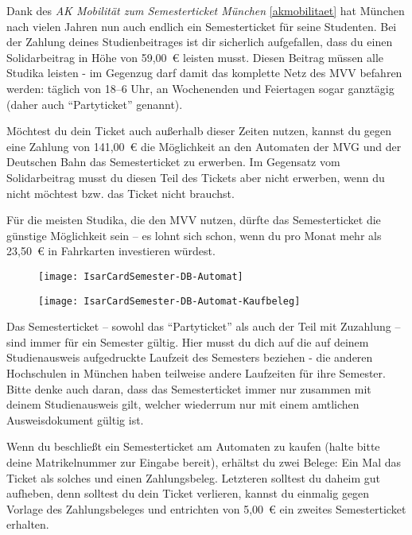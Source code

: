 Dank des \emph{AK Mobilität zum Semesterticket München} \ref{akmobilitaet} hat München nach vielen Jahren nun auch endlich ein Semesterticket für seine Studenten. Bei der Zahlung deines Studienbeitrages ist dir sicherlich aufgefallen, dass du einen Solidarbeitrag in Höhe von 59,00~€ leisten musst. Diesen Beitrag müssen alle Studika leisten - im Gegenzug darf damit das komplette Netz des MVV befahren werden: täglich von 18--6 Uhr, an Wochenenden und Feiertagen sogar ganztägig (daher auch ``Partyticket'' genannt).


Möchtest du dein Ticket auch außerhalb dieser Zeiten nutzen, kannst du gegen eine Zahlung von 141,00~€ die Möglichkeit an den Automaten der MVG und der Deutschen Bahn das Semesterticket zu erwerben. Im Gegensatz vom Solidarbeitrag musst du diesen Teil des Tickets aber nicht erwerben, wenn du nicht möchtest bzw. das Ticket nicht brauchst.

Für die meisten Studika, die den MVV nutzen, dürfte das Semesterticket die günstige Möglichkeit sein -- es lohnt sich schon, wenn du pro Monat mehr als 23,50~€ in Fahrkarten investieren würdest.

\begin{figure}[ht]
\centering
	\begin{minipage}[b]{0.45\linewidth}
		\texttt{[image: IsarCardSemester-DB-Automat]}
		\label{fig:isarcardsemesterdb}
	\end{minipage}
	\quad
	\begin{minipage}[b]{0.45\linewidth}
		\texttt{[image: IsarCardSemester-DB-Automat-Kaufbeleg]}
		\label{fig:isarcardsemesterbelegdb}
	\end{minipage}
\end{figure}

Das Semesterticket -- sowohl das ``Partyticket'' als auch der Teil mit Zuzahlung -- sind immer für ein Semester gültig. Hier musst du dich auf die auf deinem Studienausweis aufgedruckte Laufzeit des Semesters beziehen - die anderen Hochschulen in München haben teilweise andere Laufzeiten für ihre Semester. Bitte denke auch daran, dass das Semesterticket immer nur zusammen mit deinem Studienausweis gilt, welcher wiederrum nur mit einem amtlichen Ausweisdokument gültig ist.

Wenn du beschließt ein Semesterticket am Automaten zu kaufen (halte bitte deine Matrikelnummer zur Eingabe bereit), erhältst du zwei Belege: Ein Mal das Ticket als solches und einen Zahlungsbeleg. Letzteren solltest du daheim gut aufheben, denn solltest du dein Ticket verlieren, kannst du einmalig gegen Vorlage des Zahlungsbeleges und entrichten von 5,00~€ ein zweites Semesterticket erhalten.

